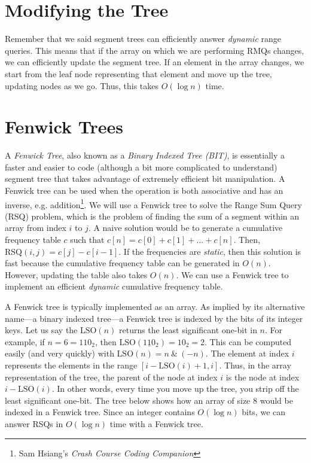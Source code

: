 \documentclass[11pt]{article}
\begin{document}
\section{Modifying the Tree}

Remember that we said segment trees can efficiently answer \textit{dynamic} range queries. This means that if the array on which we are performing RMQs changes, we can efficiently update the segment tree. If an element in the array changes, we start from the leaf node representing that element and move up the tree, updating nodes as we go. Thus, this takes $O(\log n)$ time.

\section{Fenwick Trees}
A \textit{Fenwick Tree}, also known as a \textit{Binary Indexed Tree (BIT)}, is essentially a faster and easier to code (although a bit more complicated to understand) segment tree that takes advantage of extremely efficient bit manipulation. A Fenwick tree can be used when the operation is both associative and has an inverse, e.g. addition\footnote {\label{note1}Sam Hsiang's \textit{Crash Course Coding Companion}}. We will use a Fenwick tree to solve the Range Sum Query (RSQ) problem, which is the problem of finding the sum of a segment within an array from index $i$ to $j$. A naive solution would be to generate a cumulative frequency table $c$ such that $c[n] = c[0] + c[1] + ... + c[n]$. Then, $\mathrm{RSQ}(i, j) = c[j] - c[i-1]$. If the frequencies are \textit{static}, then this solution is fast because the cumulative frequency table can be generated in $O(n)$. However, updating the table also takes $O(n)$. We can use a Fenwick tree to implement an efficient \textit{dynamic} cumulative frequency table.

A Fenwick tree is typically implemented as an array. As implied by its alternative name---a binary indexed tree---a Fenwick tree is indexed by the bits of its integer keys. Let us say the $\mathrm{LSO}(n)$ returns the least significant one-bit in $n$. For example, if $n = 6 = 110_2$, then $\mathrm{LSO}(1\underline{1}0_2) = 10_2 = 2$. This can be computed easily (and very quickly) with $\mathrm{LSO}(n) = n\ \&\ (-n)$. The element at index $i$ represents the elements in the range $[i-\mathrm{LSO}(i)+1, i]$. Thus, in the array representation of the tree, the parent of the node at index $i$ is the node at index $i - \mathrm{LSO}(i)$. In other words, every time you move up the tree, you strip off the least significant one-bit. The tree below shows how an array of size 8 would be indexed in a Fenwick tree. Since an integer contains $O(\log n)$ bits, we can answer RSQs in $O(\log n)$ time with a Fenwick tree.
\end{document}
